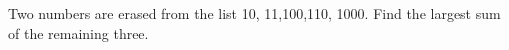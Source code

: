 Two numbers are erased from the list 10, 11,100,110, 1000. Find the largest sum of the remaining three.
